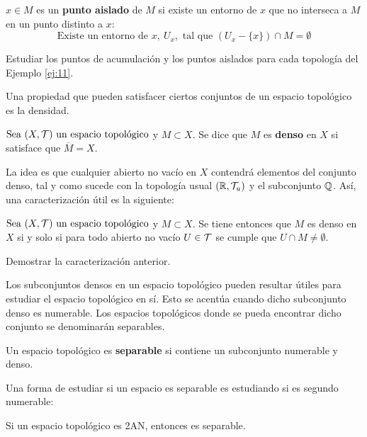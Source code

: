 \begin{deff}
    $x\in M$ es un {\bf punto aislado} de $M$ si existe un entorno de $x$ que no interseca a $M$ en un punto distinto a $x$:
    \[\text{Existe un entorno de } x, \ U_x, \text{ tal que } (U_x -\{x\}) \cap M = \emptyset \]
\end{deff}

\begin{ex}
    Estudiar los puntos de acumulación y los puntos aislados para cada topología del Ejemplo \ref{ej:11}.
\end{ex}


Una propiedad que pueden satisfacer ciertos conjuntos de un espacio topológico es la densidad.

\begin{deff}
    $\seatop$ y $M\subset X$. Se dice que $M$ es {\bf denso} en $X$ si satisface que $\overline{M} = X$.
\end{deff}

La idea es que cualquier abierto no vacío en $X$ contendrá elementos del conjunto denso, tal y como sucede con la topología usual $\topusu$ y el subconjunto $\Q$. Así, una caracterización útil es la siguiente:

\begin{prop}
    $\seatop$ y $M\subset X$. Se tiene entonces que $M$ es denso en $X$ si y solo si para todo abierto no vacío $U\in\cT$ se cumple que \(U \cap M \neq \emptyset\).
\end{prop}

\begin{ex}
    Demostrar la caracterización anterior.
\end{ex}

Los subconjuntos densos en un espacio topológico pueden resultar útiles para estudiar el espacio topológico en sí. Esto se acentúa cuando dicho subconjunto denso es numerable. Los espacios topológicos donde se pueda encontrar dicho conjunto se denominarán separables.

\begin{deff}
    Un espacio topológico es {\bf separable} si contiene un subconjunto numerable y denso.
\end{deff}

Una forma de estudiar si un espacio es separable es estudiando si es segundo numerable:

\begin{prop}
    Si un espacio topológico es 2AN, entonces es separable.
\end{prop}

